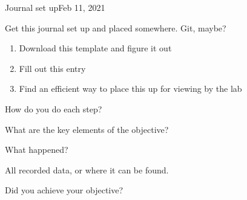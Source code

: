 \begin{entry}{Journal set up}{Feb 11, 2021}
    \objective 
    
    Get this journal set up and placed somewhere. Git, maybe?
    
    \outline
    
    \begin{enumerate}
        \item Download this template and figure it out
        \item Fill out this entry
        \item Find an efficient way to place this up for viewing by the lab
    \end{enumerate}
    
    \procedures
    
    How do you do each step?
    
    \parameters
    
    What are the key elements of the objective?
    
    \observations
    
    What happened?
    
    \data
    
    All recorded data, or where it can be found.
    
    \results
    
    Did you achieve your objective?
    
\end{entry}